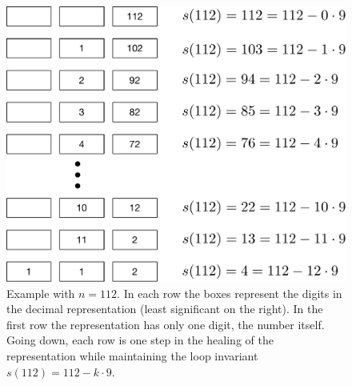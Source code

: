 \begin{figure}
\includegraphics[scale=0.5]{example.pdf}
\caption{Example with $n=112$. In each row the boxes represent the digits in the decimal representation (least significant on the right). In the first row the representation has only one digit, the number itself. Going down, each row is one step in the healing of the representation while maintaining the loop invariant $s(112) = 112 - k \cdot 9$.}
\end{figure}



